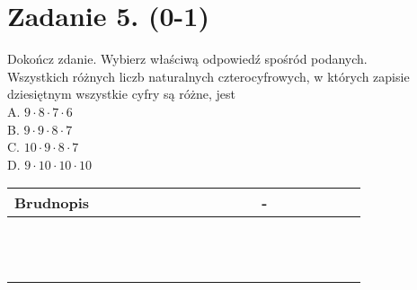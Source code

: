 \documentclass[10pt]{article}
\begin{document}
\section*{Zadanie 5. (0-1)}
Dokończ zdanie. Wybierz właściwą odpowiedź spośród podanych.\\
Wszystkich różnych liczb naturalnych czterocyfrowych, w których zapisie dziesiętnym wszystkie cyfry są różne, jest\\
A. \(9 \cdot 8 \cdot 7 \cdot 6\)\\
B. \(9 \cdot 9 \cdot 8 \cdot 7\)\\
C. \(10 \cdot 9 \cdot 8 \cdot 7\)\\
D. \(9 \cdot 10 \cdot 10 \cdot 10\)

\begin{center}
\begin{tabular}{|c|c|c|c|c|c|c|c|c|c|c|c|c|c|c|c|c|c|c|c|c|c|c|}
\hline
\multicolumn{5}{|l|}{Brudnopis} &  &  &  &  &  &  &  &  &  &  &  & - &  &  &  &  &  &  \\
\hline
 &  &  &  &  &  &  &  &  &  &  &  &  &  &  &  &  &  &  &  &  &  &  \\
\hline
 &  &  &  &  &  &  &  &  &  &  &  &  &  &  &  &  &  &  &  &  &  &  \\
\hline
 &  &  &  &  &  &  &  &  &  &  &  &  &  &  &  &  &  &  &  &  &  &  \\
\hline
 &  &  &  &  &  &  &  &  &  &  &  &  &  &  &  &  &  &  &  &  &  &  \\
\hline
 &  &  &  &  &  &  &  &  &  &  &  &  &  &  &  &  &  &  &  &  &  &  \\
\hline
 &  &  &  &  &  &  &  &  &  &  &  &  &  &  &  &  &  &  &  &  &  &  \\
\hline
 &  &  &  &  &  &  &  &  &  &  &  &  &  &  &  &  &  &  &  &  &  &  \\
\hline
 &  &  &  &  &  &  &  &  &  &  &  &  &  &  &  &  &  &  &  &  &  &  \\
\hline
 &  &  &  &  &  &  &  &  &  &  &  &  &  &  &  &  &  &  &  &  &  &  \\
\hline
 &  &  &  &  &  &  &  &  &  &  &  &  &  &  &  &  &  &  &  &  &  &  \\
\hline
 &  &  &  &  &  &  &  &  &  &  &  &  &  &  &  &  &  &  &  &  &  &  \\
\hline
 &  &  &  &  &  &  &  &  &  &  &  &  &  &  &  &  &  &  &  &  &  &  \\
\hline
\end{tabular}
\end{center}
\end{document}
